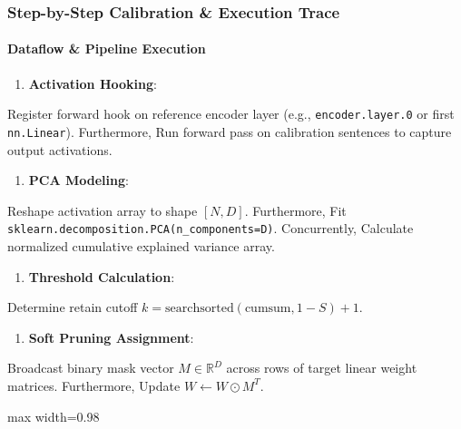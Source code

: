 \subsubsection*{Step-by-Step Calibration \& Execution Trace}

\paragraph{Dataflow \& Pipeline Execution}

\begin{enumerate}
\item \textbf{Activation Hooking}:
\end{enumerate}
Register forward hook on reference encoder layer (e.g., \texttt{encoder.layer.0} or first \texttt{nn.Linear}). Furthermore, Run forward pass on calibration sentences to capture output activations.

\begin{enumerate}
\item \textbf{PCA Modeling}:
\end{enumerate}
Reshape activation array to shape $[N, D]$. Furthermore, Fit \texttt{sklearn.decomposition.PCA(n\_components=D)}. Concurrently, Calculate normalized cumulative explained variance array.

\begin{enumerate}
\item \textbf{Threshold Calculation}:
\end{enumerate}
Determine retain cutoff $k = \text{searchsorted}(\text{cumsum}, 1 - S) + 1$.

\begin{enumerate}
\item \textbf{Soft Pruning Assignment}:
\end{enumerate}
Broadcast binary mask vector $M \in \mathbb{R}^D$ across rows of target linear weight matrices. Furthermore, Update $W \leftarrow W \odot M^T$.


\begin{center}
\begin{adjustbox}{max width=0.98\columnwidth}
\end{adjustbox}
\end{center}


